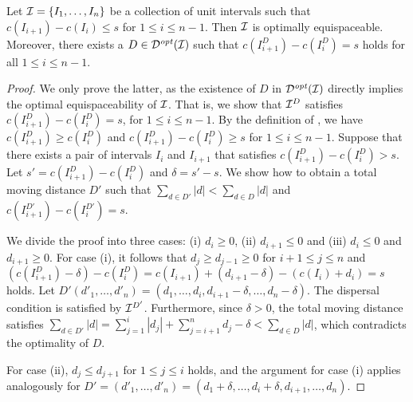 \begin{lemma}\label{lem:partition_opt}
    Let $\mathcal{I} = \{I_1,\ldots,I_n\}$ be a collection of unit intervals such that $c(I_{i+1}) - c(I_{i}) \le s$ for $1\le i \le n-1$.
    Then $\mathcal{I}$ is optimally equispaceable.
    Moreover, there exists a $D \in \mathcal{D}^{\mathit{opt}}(\mathcal{I})$ such that $c(I^D_{i+1}) -c(I^D_i) = s$ holds for all $1 \le i \le n-1$.
\end{lemma}
\begin{proof}
    We only prove the latter, as the existence of $D$ in $\mathcal{D}^{\mathit{opt}}(\mathcal{I})$ directly implies the optimal equispaceability of $\mathcal{I}$.
    That is, we show that $\mathcal{I}^D$ satisfies $c(I^D_{i+1}) - c(I^D_i) = s$, for $1 \le i \le n-1$.
    By the definition of {\idisp}, we have $c(I^D_{i+1}) \ge c(I^D_{i})$ and $c(I^D_{i+1}) - c(I^D_{i}) \ge s$ for $1\le i \le n-1$.
    Suppose that there exists a pair of intervals $I_i$ and $I_{i+1}$ that satisfies $c(I^D_{i+1}) - c(I^D_{i}) > s$. 
    Let $s' = c(I^D_{i+1}) - c(I^D_{i})$ and $\delta = s'-s$.
    We show how to obtain a total moving distance $D'$ such that $\sum_{d\in D'} |d|< \sum_{d\in D} |d|$ and $c(I^{D'}_{i+1}) - c(I^{D'}_{i}) = s$.
    
    We divide the proof into three cases: (i) $d_i \ge 0$, (ii) $d_{i+1} \le 0$ and (iii) $d_i\le 0$ and $d_{i+1}\ge 0$. 
    For case (i), it follows that $d_j \ge d_{j-1}\ge 0$ for $i+1\le j \le n$ and $(c(I^D_{i+1})-\delta) - c(I^D_{i})  = c(I_{i+1})+(d_{i+1}-\delta) - (c(I_i) + d_i) = s$ holds.
    Let $D' (d'_1,\ldots,d'_n) = (d_1,\ldots,d_i,d_{i+1}-\delta,\ldots,d_{n}-\delta)$.
    The dispersal condition is satisfied by $\mathcal{I}^{D'}$.
    Furthermore, since $\delta > 0$, the total moving distance satisfies 
    $\sum_{d\in D'} |d| = \sum_{j=1}^i |d_j| + \sum_{j=i+1}^n d_j - \delta < \sum_{d\in D} |d|$, which contradicts the optimality of $D$.
    
    For case (ii), $d_j \le d_{j+1}$ for $1\le j \le i$ holds, and the argument for case (i) applies analogously for $D' = (d'_1,\ldots,d'_n) = (d_1+\delta,\ldots,d_i+\delta,d_{i+1},\ldots,d_{n})$.
    

\end{proof}
